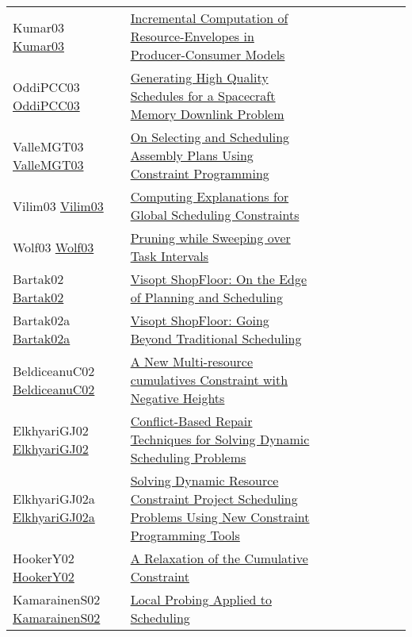 {\begin{longtable}{p{3cm}p{7cm}lllllll}
Kumar03 \href{https://doi.org/10.1007/978-3-540-45193-8\_45}{Kumar03} &  \href{papers/Kumar03.pdf}{Incremental Computation of Resource-Envelopes in Producer-Consumer Models} &  &  &  &  &  &  & \\
OddiPCC03 \href{https://doi.org/10.1007/978-3-540-45193-8\_39}{OddiPCC03} &  \href{papers/OddiPCC03.pdf}{Generating High Quality Schedules for a Spacecraft Memory Downlink Problem} &  &  &  &  &  &  & \\
ValleMGT03 \href{https://doi.org/10.1007/978-3-540-45226-3\_180}{ValleMGT03} &  \href{papers/ValleMGT03.pdf}{On Selecting and Scheduling Assembly Plans Using Constraint Programming} &  &  &  &  &  &  & \\
Vilim03 \href{https://doi.org/10.1007/978-3-540-45193-8\_124}{Vilim03} &  \href{papers/Vilim03.pdf}{Computing Explanations for Global Scheduling Constraints} &  &  &  &  &  &  & \\
Wolf03 \href{https://doi.org/10.1007/978-3-540-45193-8\_50}{Wolf03} &  \href{papers/Wolf03.pdf}{Pruning while Sweeping over Task Intervals} &  &  &  &  &  &  & \\
Bartak02 \href{https://doi.org/10.1007/3-540-46135-3\_39}{Bartak02} &  \href{papers/Bartak02.pdf}{Visopt ShopFloor: On the Edge of Planning and Scheduling} &  &  &  &  &  &  & \\
Bartak02a \href{https://doi.org/10.1007/3-540-36607-5\_14}{Bartak02a} &  \href{papers/Bartak02a.pdf}{Visopt ShopFloor: Going Beyond Traditional Scheduling} &  &  &  &  &  &  & \\
BeldiceanuC02 \href{https://doi.org/10.1007/3-540-46135-3\_5}{BeldiceanuC02} &  \href{papers/BeldiceanuC02.pdf}{A New Multi-resource cumulatives Constraint with Negative Heights} &  &  &  &  &  &  & \\
ElkhyariGJ02 \href{https://doi.org/10.1007/3-540-46135-3\_49}{ElkhyariGJ02} &  \href{papers/ElkhyariGJ02.pdf}{Conflict-Based Repair Techniques for Solving Dynamic Scheduling Problems} &  &  &  &  &  &  & \\
ElkhyariGJ02a \href{https://doi.org/10.1007/978-3-540-45157-0\_3}{ElkhyariGJ02a} &  \href{papers/ElkhyariGJ02a.pdf}{Solving Dynamic Resource Constraint Project Scheduling Problems Using New Constraint Programming Tools} &  &  &  &  &  &  & \\
HookerY02 \href{https://doi.org/10.1007/3-540-46135-3\_46}{HookerY02} &  \href{papers/HookerY02.pdf}{A Relaxation of the Cumulative Constraint} &  &  &  &  &  &  & \\
KamarainenS02 \href{https://doi.org/10.1007/3-540-46135-3\_11}{KamarainenS02} &  \href{papers/KamarainenS02.pdf}{Local Probing Applied to Scheduling} &  &  &  &  &  &  & \\

\end{longtable}}
